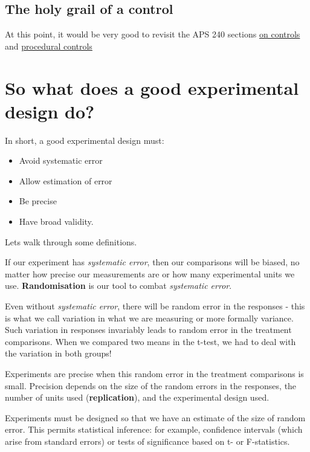 \documentclass[
]{book}
\providecommand{\tightlist}{%
  \setlength{\itemsep}{0pt}\setlength{\parskip}{0pt}}
\begin{document}
\subsection{The holy grail of a control}\label{the-holy-grail-of-a-control}

At this point, it would be very good to revisit the APS 240 sections \href{https://dzchilds.github.io/stats-for-bio/principles-experimental-design.html\#experimental-control}{on controls} and \href{https://dzchilds.github.io/stats-for-bio/principles-experimental-design.html\#EXPT-DESIGN-PROCEDURAL-CONTROLS}{procedural controls}

\section{So what does a good experimental design do?}\label{so-what-does-a-good-experimental-design-do}

In short, a good experimental design must:

\begin{itemize}
\tightlist
\item
  Avoid systematic error
\item
  Allow estimation of error
\item
  Be precise
\item
  Have broad validity.
\end{itemize}

Lets walk through some definitions.

If our experiment has \emph{systematic error}, then our comparisons will be biased, no matter how precise our measurements are or how many experimental units we use. \textbf{Randomisation} is our tool to combat \emph{systematic error}.

Even without \emph{systematic error}, there will be random error in the responses - this is what we call variation in what we are measuring or more formally variance. Such variation in responses invariably leads to random error in the treatment comparisons. When we compared two means in the t-test, we had to deal with the variation in both groups!

Experiments are precise when this random error in the treatment comparisons is small. Precision depends on the size of the random errors in the responses, the number of units used (\textbf{replication}), and the experimental design used.

Experiments must be designed so that we have an estimate of the size of random error. This permits statistical inference: for example, confidence intervals (which arise from standard errors) or tests of significance based on t- or F-statistics.
\end{document}
